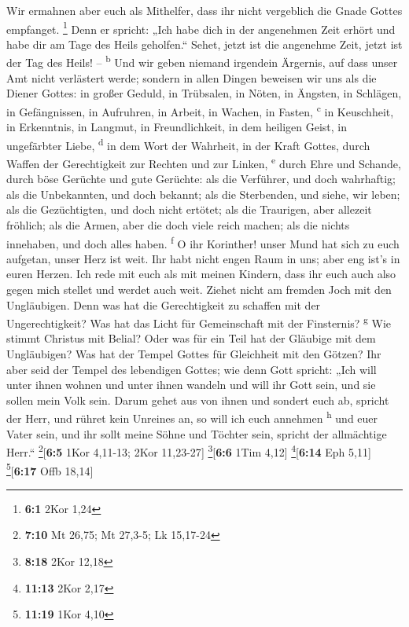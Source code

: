  Wir ermahnen aber euch als Mithelfer, dass ihr nicht
vergeblich die Gnade Gottes empfanget. \footnote{\textbf{6:1} 2Kor 1,24}
 Denn er spricht: „Ich habe dich in der angenehmen Zeit
erhört und habe dir am Tage des Heils geholfen.`` Sehet, jetzt ist die
angenehme Zeit, jetzt ist der Tag des Heils! -- \textsuperscript{b}
 Und wir geben niemand irgendein Ärgernis, auf dass unser
Amt nicht verlästert werde;  sondern in allen Dingen
beweisen wir uns als die Diener Gottes: in großer Geduld, in Trübsalen,
in Nöten, in Ängsten,  in Schlägen, in Gefängnissen, in
Aufruhren, in Arbeit, in Wachen, in Fasten, \textsuperscript{c}
 in Keuschheit, in Erkenntnis, in Langmut, in
Freundlichkeit, in dem heiligen Geist, in ungefärbter Liebe,
\textsuperscript{d}  in dem Wort der Wahrheit, in der
Kraft Gottes, durch Waffen der Gerechtigkeit zur Rechten und zur Linken,
\textsuperscript{e}  durch Ehre und Schande, durch böse
Gerüchte und gute Gerüchte: als die Verführer, und doch wahrhaftig;
 als die Unbekannten, und doch bekannt; als die
Sterbenden, und siehe, wir leben; als die Gezüchtigten, und doch nicht
ertötet;  als die Traurigen, aber allezeit fröhlich; als
die Armen, aber die doch viele reich machen; als die nichts innehaben,
und doch alles haben. \textsuperscript{f}  O ihr
Korinther! unser Mund hat sich zu euch aufgetan, unser Herz ist weit.
 Ihr habt nicht engen Raum in uns; aber eng ist's in
euren Herzen.  Ich rede mit euch als mit meinen Kindern,
dass ihr euch auch also gegen mich stellet und werdet auch weit.
 Ziehet nicht am fremden Joch mit den Ungläubigen. Denn
was hat die Gerechtigkeit zu schaffen mit der Ungerechtigkeit? Was hat
das Licht für Gemeinschaft mit der Finsternis? \textsuperscript{g}
 Wie stimmt Christus mit Belial? Oder was für ein Teil
hat der Gläubige mit dem Ungläubigen?  Was hat der Tempel
Gottes für Gleichheit mit den Götzen? Ihr aber seid der Tempel des
lebendigen Gottes; wie denn Gott spricht: „Ich will unter ihnen wohnen
und unter ihnen wandeln und will ihr Gott sein, und sie sollen mein Volk
sein.  Darum gehet aus von ihnen und sondert euch ab,
spricht der Herr, und rühret kein Unreines an, so will ich euch annehmen
\textsuperscript{h}  und euer Vater sein, und ihr sollt
meine Söhne und Töchter sein, spricht der allmächtige Herr.``
\footnote{\textbf{7:10} Mt 26,75; Mt 27,3-5; Lk 15,17-24}{[}\textbf{6:5}
1Kor 4,11-13; 2Kor 11,23-27{]} \footnote{\textbf{8:18} 2Kor 12,18}{[}\textbf{6:6}
1Tim 4,12{]} \footnote{\textbf{11:13} 2Kor 2,17}{[}\textbf{6:14} Eph
5,11{]} \footnote{\textbf{11:19} 1Kor 4,10}{[}\textbf{6:17} Offb
18,14{]}

